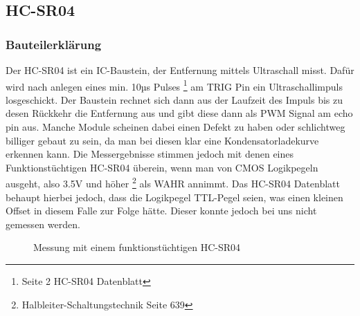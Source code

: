 \documentclass[12pt,a4paper,german]{article}
\begin{document}
\subsection{HC-SR04}

\subsubsection{Bauteilerklärung}
	
	Der HC-SR04 ist ein IC-Baustein, der Entfernung mittels Ultraschall
	misst. Dafür wird nach anlegen eines min. 10µs Pulses
	\footnote{Seite 2 HC-SR04 Datenblatt}
	am TRIG Pin
	ein Ultraschallimpuls losgeschickt. Der Baustein rechnet sich dann aus
	der Laufzeit des Impuls bis zu desen Rückkehr die Entfernung aus und
	gibt diese dann als PWM Signal am echo pin aus. Manche
	Module scheinen dabei einen Defekt zu haben oder schlichtweg billiger
	gebaut zu sein, da man bei diesen klar eine Kondensatorladekurve
	erkennen kann. Die Messergebnisse stimmen jedoch mit denen eines
	Funktionstüchtigen HC-SR04 überein, wenn man von CMOS Logikpegeln
	ausgeht, also 3.5V und höher
	\footnote{Halbleiter-Schaltungstechnik Seite 639} als 
	WAHR annimmt. Das HC-SR04 Datenblatt behaupt hierbei jedoch, dass die
	Logikpegel TTL-Pegel seien, was einen kleinen Offset in diesem Falle
	zur Folge hätte. Dieser konnte jedoch bei uns nicht gemessen werden.
	

	\begin{figure}[H]
		
		\centering
		\label{fig:hc-sr04_working}

		\caption{Messung mit einem funktionstüchtigen HC-SR04}
	\end{figure}
	
\end{document}
